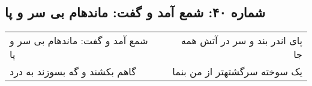 \begin{center}
\section*{شماره ۴۰: شمع آمد و گفت: ماندهام بی سر و پا}
\label{sec:040}
\begin{longtable}{l p{0.5cm} r}
شمع آمد و گفت: ماندهام بی سر و پا
&&
پای اندر بند و سر در آتش همه جا
\\
گاهم بکشند و گه بسوزند به درد
&&
یک سوخته سرگشتهتر از من بنما
\\
\end{longtable}
\end{center}
